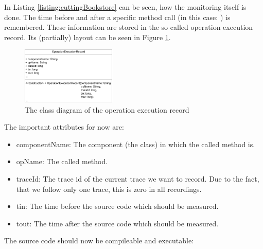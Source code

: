 		
		
		In Listing \ref{listing:cuttingBookstore}  can be seen, how the monitoring itself is done. The time before and after a specific method call (in this case: ) is remembered. These information are stored in the so called operation execution record. Its (partially) layout can be seen in Figure \ref{Figure:OperationExecutionRecordClassDiagram}.

		\begin{figure}[H]
			\begin{centering}
				\includegraphics[width=0.4\textwidth]{images/OpExRecClassDiagram}
				\caption{The class diagram of the operation execution record}
				\label{Figure:OperationExecutionRecordClassDiagram}
			\end{centering}
		\end{figure}

		The important attributes for now are:
		\begin{itemize}
			\item componentName: The component (the class) in which the called method is.
			\item opName: The called method.
			\item traceId: The trace id of the current trace we want to record. Due to the fact, that we follow only one trace, this is zero in all recordings.
			\item tin: The time before the source code which should be measured.
			\item tout: The time after the source code which should be measured.
		\end{itemize}
		The source code should now be compileable and executable:

		\setBashListing 		
					

